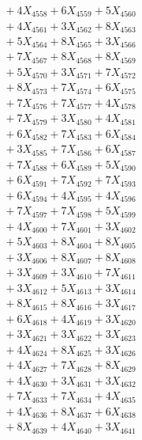 \documentclass[a4paper,10pt]{article}
\begin{document}
{\begin{align}
&\;  + 4 X_{4558} + 6 X_{4559} + 5 X_{4560} \\[0.3ex]
&\;  + 4 X_{4561} + 3 X_{4562} + 8 X_{4563} \\[0.3ex]
&\;  + 5 X_{4564} + 8 X_{4565} + 3 X_{4566} \\[0.3ex]
&\;  + 7 X_{4567} + 8 X_{4568} + 8 X_{4569} \\[0.5ex]\allowbreak
&\;  + 5 X_{4570} + 3 X_{4571} + 7 X_{4572} \\[0.3ex]
&\;  + 8 X_{4573} + 7 X_{4574} + 6 X_{4575} \\[0.3ex]
&\;  + 7 X_{4576} + 7 X_{4577} + 4 X_{4578} \\[0.3ex]
&\;  + 7 X_{4579} + 3 X_{4580} + 4 X_{4581} \\[0.3ex]
&\;  + 6 X_{4582} + 7 X_{4583} + 6 X_{4584} \\[0.3ex]
&\;  + 3 X_{4585} + 7 X_{4586} + 6 X_{4587} \\[0.3ex]
&\;  + 7 X_{4588} + 6 X_{4589} + 5 X_{4590} \\[0.3ex]
&\;  + 6 X_{4591} + 7 X_{4592} + 7 X_{4593} \\[0.3ex]
&\;  + 6 X_{4594} + 4 X_{4595} + 4 X_{4596} \\[0.3ex]
&\;  + 7 X_{4597} + 7 X_{4598} + 5 X_{4599} \\[0.5ex]\allowbreak
&\;  + 4 X_{4600} + 7 X_{4601} + 3 X_{4602} \\[0.3ex]
&\;  + 5 X_{4603} + 8 X_{4604} + 8 X_{4605} \\[0.3ex]
&\;  + 3 X_{4606} + 8 X_{4607} + 8 X_{4608} \\[0.3ex]
&\;  + 3 X_{4609} + 3 X_{4610} + 7 X_{4611} \\[0.3ex]
&\;  + 3 X_{4612} + 5 X_{4613} + 3 X_{4614} \\[0.3ex]
&\;  + 8 X_{4615} + 8 X_{4616} + 3 X_{4617} \\[0.3ex]
&\;  + 6 X_{4618} + 4 X_{4619} + 3 X_{4620} \\[0.3ex]
&\;  + 3 X_{4621} + 3 X_{4622} + 3 X_{4623} \\[0.3ex]
&\;  + 4 X_{4624} + 8 X_{4625} + 3 X_{4626} \\[0.3ex]
&\;  + 4 X_{4627} + 7 X_{4628} + 8 X_{4629} \\[0.5ex]\allowbreak
&\;  + 4 X_{4630} + 3 X_{4631} + 3 X_{4632} \\[0.3ex]
&\;  + 7 X_{4633} + 7 X_{4634} + 4 X_{4635} \\[0.3ex]
&\;  + 4 X_{4636} + 8 X_{4637} + 6 X_{4638} \\[0.3ex]
&\;  + 8 X_{4639} + 4 X_{4640} + 3 X_{4641} \\[0.3ex]

\end{align}}
\end{document}
